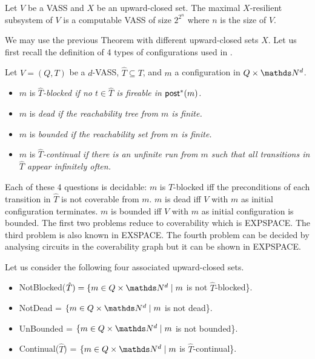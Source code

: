 \begin{theorem}{}
Let $V$ be a VASS and $X$ be an upward-closed set. The maximal $X$-resilient subsystem of $V$ is a computable VASS of size $2^{2^n}$ where $n$ is the size of $V$.
\end{theorem}

We may use the previous Theorem with different upward-closed sets $X$. Let us first recall the definition of 4 types of configurations used in \cite{DBLP:journals/acta/ValkJ85}.

\begin{definition}
Let $V = (Q,T)$ be a $d$-VASS, $\hat{T} \subseteq T$, and $m$ a configuration in $Q \times \N^d$.
\begin{itemize}
\item  $m$ is \em{$\hat{T}$-blocked} if no $t \in \hat{T}$ is fireable in $\textsf{post}^*(m)$.
\item $m$ is \em{dead} if the reachability tree from $m$ is finite.
\item $m$ is \em{bounded} if the reachability set from $m$ is finite.
\item $m$ is \em{$\hat{T}$-continual} if there is an unfinite run from $m$ such that all transitions in $\hat{T}$ appear infinitely often.
\end{itemize}
\end{definition}

Each of these 4 questions is decidable: $m$ is $\hat{T}$-blocked iff the preconditions of each transition in $\hat{T}$ is not coverable from $m$.
$m$ is dead iff $V$ with $m$ as initial configuration terminates. $m$ is bounded iff $V$ with $m$ as initial configuration is bounded.
The first two problems reduce to coverability which is EXPSPACE. The third problem is also known in EXSPACE. The fourth problem can be decided by analysing circuits in the coverability graph \cite{DBLP:journals/acta/ValkJ85} but it can be shown in EXPSPACE.

Let us consider the following four associated upward-closed sets.

\begin{itemize}
\item  NotBlocked($\hat{T})= \{ m \in Q \times \N^d \mid m$ is not $\hat{T}$-blocked\}.
\item NotDead = $\{ m \in Q \times \N^d \mid m$ is not dead\}.
\item UnBounded = $\{ m \in Q \times \N^d \mid m$ is not bounded\}.
\item Continual($\hat{T}$) = $\{ m \in Q \times \N^d \mid m$ is $\hat{T}$-continual\}.
\end{itemize}

